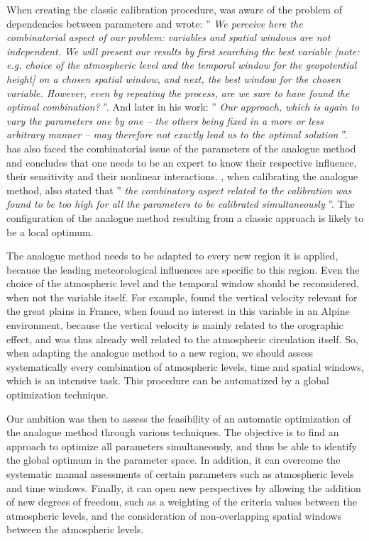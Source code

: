 \documentclass{ametsoc}
\begin{document}
When creating the classic calibration procedure, \citet{Bontron2004} was aware of the problem of dependencies between parameters and wrote: '' \textit{We perceive here the combinatorial aspect of our problem: variables and spatial windows are not independent. We will present our results by first searching the best variable [note: e.g. choice of the atmospheric level and the temporal window for the geopotential height] on a chosen spatial window, and next, the best window for the chosen variable. However, even by repeating the process, are we sure to have found the optimal combination?} ''. And later in his work: '' \textit{Our approach, which is again to vary the parameters one by one -- the others being fixed in a more or less arbitrary manner -- may therefore not exactly lead us to the optimal solution} ''. \citet{Bliefernicht2010} has also faced the combinatorial issue of the parameters of the analogue method and concludes that one needs to be an expert to know their respective influence, their sensitivity and their nonlinear interactions. \citet{BenDaoud2010}, when calibrating the analogue method, also stated that '' \textit{the combinatory aspect related to the calibration was found to be too high for all the parameters to be calibrated simultaneously } ''. The configuration of the analogue method resulting from a classic approach is likely to be a local optimum.

The analogue method needs to be adapted to every new region it is applied, because the leading meteorological influences are specific to this region. Even the choice of the atmospheric level and the temporal window should be reconsidered, when not the variable itself. For example, \citet{BenDaoud2010} found the vertical velocity relevant for the great plains in France, when \citet{Horton2012} found no interest in this variable in an Alpine environment, because the vertical velocity is mainly related to the orographic effect, and was thus already well related to the atmospheric circulation itself. So, when adapting the analogue method to a new region, we should assess systematically every combination of atmospheric levels, time and spatial windows, which is an intensive task. This procedure can be automatized by a global optimization technique.

Our ambition was then to assess the feasibility of an automatic optimization of the analogue method through various techniques. The objective is to find an approach to optimize all parameters simultaneously, and thus be able to identify the global optimum in the parameter space. In addition, it can overcome the systematic manual assessments of certain parameters such as atmospheric levels and time windows. Finally, it can open new perspectives by allowing the addition of new degrees of freedom, such as a weighting of the criteria values between the atmospheric levels, and the consideration of non-overlapping spatial windows between the atmospheric levels.
\end{document}
